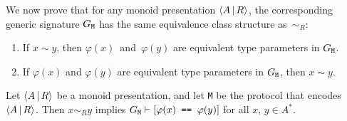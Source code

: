 \documentclass[../generics]{subfiles}
\begin{document}
We now prove that for any monoid presentation $\langle A\,|\,R\rangle$, the corresponding generic signature $G_\texttt{M}$ has the same equivalence class structure as~$\sim_R$:
\begin{enumerate}
\item If $x\sim y$, then $\varphi(x)$~and~$\varphi(y)$ are equivalent type parameters in $G_\texttt{M}$.
\item If $\varphi(x)$ and $\varphi(y)$ are equivalent type parameters in $G_\texttt{M}$, then $x\sim y$.
\end{enumerate}

\begin{theorem}\label{path to derivation}
Let $\langle A\,|\,R\rangle$ be a monoid presentation, and let \texttt{M} be the protocol that encodes $\langle A\,|\,R\rangle$. Then $x\sim_R y$ implies $G_\texttt{M}\vdash[\texttt{$\varphi(x)$ == $\varphi(y)$}]$ for all $x$, $y\in A^*$.
\end{theorem}
\end{document}

